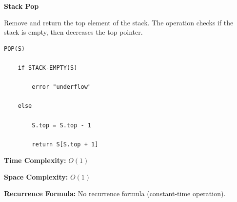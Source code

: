 \documentclass[a4paper,12pt]{article}
\begin{document}
\begin{tcolorbox}[
    colback=gray!30,
    colframe=black,
    boxrule=1pt,
    arc=0mm
]

\begin{tcolorbox}[
    colback=gray!10,
    colframe=black,
    arc=0mm
]
\centering
{\Huge\bfseries Stack Pop}
\end{tcolorbox}


\begin{tcolorbox}[
    colback=gray!10,
    colframe=black,
    arc=0mm
]
\small
Remove and return the top element of the stack.
The operation checks if the stack is empty, then decreases the top pointer.
\end{tcolorbox}


\begin{tcolorbox}[
    colback=black!5,
    colframe=black,
    arc=0mm,
    title=Pseudo-code
]
\tiny
\begin{lstlisting}
POP(S)

    if STACK-EMPTY(S)

        error "underflow"

    else

        S.top = S.top - 1

        return S[S.top + 1]
\end{lstlisting}
\end{tcolorbox}


\begin{tcolorbox}[
    colback=cyan!20,
    colframe=black,
    arc=0mm
]
\small
\textbf{Time Complexity:}
$O(1)$
\end{tcolorbox}


\begin{tcolorbox}[
    colback=violet!20,
    colframe=black,
    arc=0mm
]
\small
\textbf{Space Complexity:}
$O(1)$
\end{tcolorbox}


\begin{tcolorbox}[
    colback=pink!20,
    colframe=black,
    arc=0mm
]
\small
\textbf{Recurrence Formula:}
No recurrence formula (constant-time operation).
\end{tcolorbox}

\end{tcolorbox}
\end{document}
